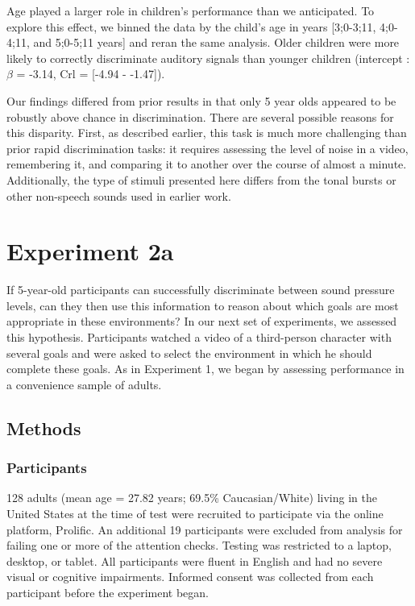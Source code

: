 \documentclass[10pt, letterpaper]{article}
\begin{document}
Age played a larger role in children's performance than we anticipated.
To explore this effect, we binned the data by the child's age in years
{[}3;0-3;11, 4;0-4;11, and 5;0-5;11 years{]} and reran the same
analysis. Older children were more likely to correctly discriminate
auditory signals than younger children (intercept : \(\beta\) = -3.14,
Crl = {[}-4.94 - -1.47{]}).

Our findings differed from prior results in that only 5 year olds
appeared to be robustly above chance in discrimination. There are
several possible reasons for this disparity. First, as described
earlier, this task is much more challenging than prior rapid
discrimination tasks: it requires assessing the level of noise in a
video, remembering it, and comparing it to another over the course of
almost a minute. Additionally, the type of stimuli presented here
differs from the tonal bursts or other non-speech sounds used in earlier
work.

\hypertarget{experiment-2a}{%
\section{Experiment 2a}\label{experiment-2a}}

If 5-year-old participants can successfully discriminate between sound
pressure levels, can they then use this information to reason about
which goals are most appropriate in these environments? In our next set
of experiments, we assessed this hypothesis. Participants watched a
video of a third-person character with several goals and were asked to
select the environment in which he should complete these goals. As in
Experiment 1, we began by assessing performance in a convenience sample
of adults.

\hypertarget{methods-2}{%
\subsection{Methods}\label{methods-2}}

\hypertarget{participants-2}{%
\subsubsection{Participants}\label{participants-2}}

128 adults (mean age = 27.82 years; 69.5\% Caucasian/White) living in
the United States at the time of test were recruited to participate via
the online platform, Prolific. An additional 19 participants were
excluded from analysis for failing one or more of the attention checks.
Testing was restricted to a laptop, desktop, or tablet. All participants
were fluent in English and had no severe visual or cognitive
impairments. Informed consent was collected from each participant before
the experiment began.
\end{document}
